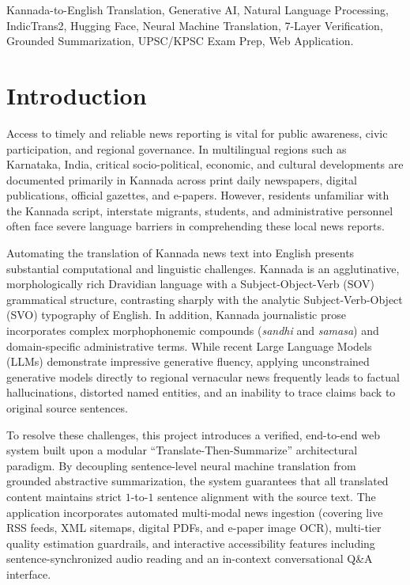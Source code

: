 \documentclass[conference]{IEEEtran}
\begin{document}
\begin{IEEEkeywords}
Kannada-to-English Translation, Generative AI, Natural Language Processing, IndicTrans2, Hugging Face, Neural Machine Translation, 7-Layer Verification, Grounded Summarization, UPSC/KPSC Exam Prep, Web Application.
\end{IEEEkeywords}

\section{Introduction}
\label{sec:introduction}

Access to timely and reliable news reporting is vital for public awareness, civic participation, and regional governance. In multilingual regions such as Karnataka, India, critical socio-political, economic, and cultural developments are documented primarily in Kannada across print daily newspapers, digital publications, official gazettes, and e-papers. However, residents unfamiliar with the Kannada script, interstate migrants, students, and administrative personnel often face severe language barriers in comprehending these local news reports. 

Automating the translation of Kannada news text into English presents substantial computational and linguistic challenges. Kannada is an agglutinative, morphologically rich Dravidian language with a Subject-Object-Verb (SOV) grammatical structure, contrasting sharply with the analytic Subject-Verb-Object (SVO) typography of English. In addition, Kannada journalistic prose incorporates complex morphophonemic compounds (\textit{sandhi} and \textit{samasa}) and domain-specific administrative terms. While recent Large Language Models (LLMs) demonstrate impressive generative fluency, applying unconstrained generative models directly to regional vernacular news frequently leads to factual hallucinations, distorted named entities, and an inability to trace claims back to original source sentences.

To resolve these challenges, this project introduces a verified, end-to-end web system built upon a modular ``Translate-Then-Summarize'' architectural paradigm. By decoupling sentence-level neural machine translation from grounded abstractive summarization, the system guarantees that all translated content maintains strict $1$-to-$1$ sentence alignment with the source text. The application incorporates automated multi-modal news ingestion (covering live RSS feeds, XML sitemaps, digital PDFs, and e-paper image OCR), multi-tier quality estimation guardrails, and interactive accessibility features including sentence-synchronized audio reading and an in-context conversational Q\&A interface.
\end{document}
